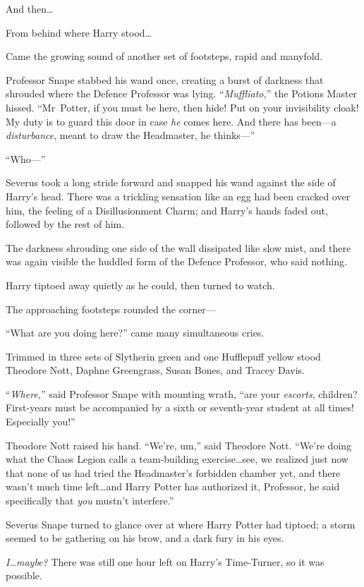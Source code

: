 And then…

From behind where Harry stood…

Came the growing sound of another set of footsteps, rapid and manyfold.

Professor Snape stabbed his wand once, creating a burst of darkness that shrouded where the Defence Professor was lying. “\emph{Muffliato,}” the Potions Master hissed. “Mr~Potter, if you must be here, then hide! Put on your invisibility cloak! My duty is to guard this door in case \emph{he} comes here. And there has been—a \emph{disturbance}, meant to draw the Headmaster, he thinks—”

“Who—”

Severus took a long stride forward and snapped his wand against the side of Harry’s head. There was a trickling sensation like an egg had been cracked over him, the feeling of a Disillusionment Charm; and Harry’s hands faded out, followed by the rest of him.

The darkness shrouding one side of the wall dissipated like slow mist, and there was again visible the huddled form of the Defence Professor, who said nothing.

Harry tiptoed away quietly as he could, then turned to watch.

The approaching footsteps rounded the corner—

“What are you doing here?” came many simultaneous cries.

Trimmed in three sets of Slytherin green and one Hufflepuff yellow stood Theodore Nott, Daphne Greengrass, Susan Bones, and Tracey Davis.

“\emph{Where,}” said Professor Snape with mounting wrath, “are your \emph{escorts}, children? First-years must be accompanied by a sixth or seventh-year student at all times! Especially you!”

Theodore Nott raised his hand. “We’re, um,” said Theodore Nott. “We’re doing what the Chaos Legion calls a team-building exercise…see, we realized just now that none of us had tried the Headmaster’s forbidden chamber yet, and there wasn’t much time left…and Harry Potter has authorized it, Professor, he said specifically that \emph{you} mustn’t interfere.”

Severus Snape turned to glance over at where Harry Potter had tiptoed; a storm seemed to be gathering on his brow, and a dark fury in his eyes.

\emph{I…maybe?} There was still one hour left on Harry’s Time-Turner, so it was possible.

